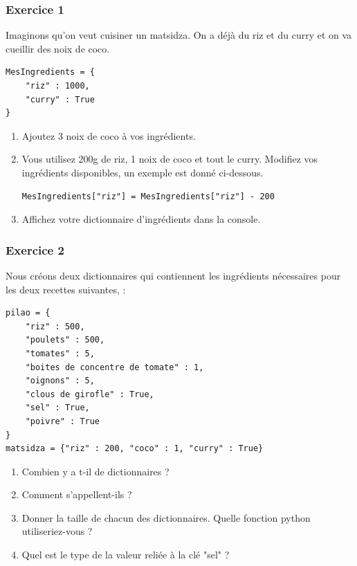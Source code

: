 \subsubsection*{Exercice 1}

Imaginons qu'on veut cuisiner un matsidza. On a déjà du riz et du curry et on va cueillir des noix de coco.
\begin{lstlisting}
MesIngredients = {
    "riz" : 1000,
    "curry" : True
} 
\end{lstlisting}

\begin{enumerate}[label=\alph*.]
    \item Ajoutez 3 noix de coco à vos ingrédients.
    \item Vous utilisez 200g de riz, 1 noix de coco et tout le curry. Modifiez vos ingrédients disponibles, un exemple est donné ci-dessous.
    \begin{lstlisting}
MesIngredients["riz"] = MesIngredients["riz"] - 200 \end{lstlisting}
    \item Affichez votre dictionnaire d'ingrédients dans la console.
\end{enumerate}

\subsubsection*{Exercice 2}
Nous créons deux dictionnaires qui contiennent les ingrédients nécessaires pour les deux recettes suivantes,  :
\begin{lstlisting}
pilao = {
    "riz" : 500,
    "poulets" : 500,
    "tomates" : 5,
    "boites de concentre de tomate" : 1,
    "oignons" : 5,
    "clous de girofle" : True,
    "sel" : True,
    "poivre" : True
}
matsidza = {"riz" : 200, "coco" : 1, "curry" : True}
\end{lstlisting}
\begin{enumerate}[label=\alph*.]
    \item Combien y a t-il de dictionnaires ?
    \item Comment s'appellent-ils ?
    \item Donner la taille de chacun des dictionnaires. Quelle fonction python utiliseriez-vous ?
    \item Quel est le type de la valeur reliée à la clé "sel" ?
\end{enumerate}


